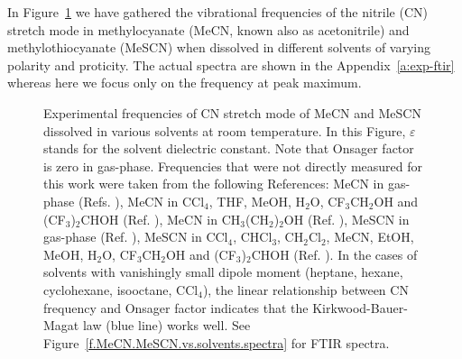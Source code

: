 \documentclass[a4paper,titlepage,twoside,fleqn,12pt]{book}
\begin{document}
\begin{refsection}
In Figure~\ref{f.MeCN.MeSCN.vs.solvents} we have gathered the vibrational 
frequencies of the nitrile (CN) stretch mode in methylocyanate (MeCN, known also as acetonitrile) and methylothiocyanate
(MeSCN) when dissolved in different solvents of varying polarity and proticity. \citep{Blasiak.Ritchie.Webb.Cho.PCCP.2016}
The actual spectra are shown in the Appendix~\ref{a:exp-ftir} whereas here we focus only
on the frequency at peak maximum.
%
\begin{figure}[ht]
\centering
\setlength\fboxsep{0.4pt}
\setlength\fboxrule{0.5pt}
\caption{Experimental frequencies of CN stretch mode of MeCN and MeSCN dissolved in
various solvents at room temperature. In this Figure, $\varepsilon$
stands for the solvent dielectric constant. Note that Onsager factor is zero in gas-phase. 
Frequencies that were not directly measured for this work were taken from the following 
References: MeCN in gas\hyp{}phase 
(Refs. \citep{Koga.Kondo.Saeki.Person.JPC.1984,Cerceau.Raulin.Courtin.Gautier.Icarus.1985,
Parker.Nielsen.Fletcher.JMS.1957}), 
MeCN in CCl$_4$, THF, MeOH, H$_2$O, CF$_3$CH$_2$OH and 
(CF$_3$)$_2$CHOH (Ref. \citep{Eaton.Pena-Nunez.Symons.JChemSocFaradTrans1.1988}), 
MeCN in CH$_3$(CH$_2$)$_2$OH (Ref. \citep{Oh.Choi.Lee.Han.Lee.Cho.JCP.2008}), 
MeSCN in gas-phase (Ref. \citep{Sullivan.Heusel.Durig.JMS.1984}), MeSCN in 
CCl$_4$, CHCl$_3$, CH$_2$Cl$_2$, MeCN, EtOH, MeOH, H$_2$O, CF$_3$CH$_2$OH and (CF$_3$)$_2$CHOH 
(Ref. \citep{Maienschein-Cline.Londergan.JPCA.2007}). In the 
cases of solvents with vanishingly small dipole moment (heptane, hexane, cyclohexane, 
isooctane, CCl$_4$), the linear relationship between CN frequency and Onsager factor indicates that 
the Kirkwood-Bauer-Magat law (blue line) works well. 
See Figure~\ref{f.MeCN.MeSCN.vs.solvents.spectra} for FTIR spectra.
\label{f.MeCN.MeSCN.vs.solvents}}
\end{figure}
%


\end{refsection}
\end{document}
